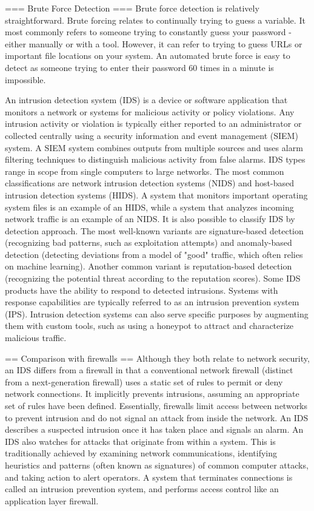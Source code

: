 === Brute Force Detection ===
Brute force detection is relatively straightforward. Brute forcing relates to continually trying to guess a variable. It most commonly refers to someone trying to constantly guess your password - either manually or with a tool. However, it can refer to trying to guess URLs or important file locations on your system.
An automated brute force is easy to detect as someone trying to enter their password 60 times in a minute is impossible.

An intrusion detection system (IDS) is a device or software application that monitors a network or systems for malicious activity or policy violations. Any intrusion activity or violation is typically either reported to an administrator or collected centrally using a security information and event management (SIEM) system. A SIEM system combines outputs from multiple sources and uses alarm filtering techniques to distinguish malicious activity from false alarms.
IDS types range in scope from single computers to large networks. The most common classifications are network intrusion detection systems (NIDS) and host-based intrusion detection systems (HIDS). A system that monitors important operating system files is an example of an HIDS, while a system that analyzes incoming network traffic is an example of an NIDS. It is also possible to classify IDS by detection approach. The most well-known variants are signature-based detection (recognizing bad patterns, such as exploitation attempts) and anomaly-based detection (detecting deviations from a model of "good" traffic, which often relies on machine learning). Another common variant is reputation-based detection (recognizing the potential threat according to the reputation scores). Some IDS products have the ability to respond to detected intrusions. Systems with response capabilities are typically referred to as an intrusion prevention system (IPS). Intrusion detection systems can also serve specific purposes by augmenting them with custom tools, such as using a honeypot to attract and characterize malicious traffic.


== Comparison with firewalls ==
Although they both relate to network security, an IDS differs from a firewall in that a conventional network firewall (distinct from a next-generation firewall) uses a static set of rules to permit or deny network connections. It implicitly prevents intrusions, assuming an appropriate set of rules have been defined. Essentially, firewalls limit access between networks to prevent intrusion and do not signal an attack from inside the network. An IDS describes a suspected intrusion once it has taken place and signals an alarm. An IDS also watches for attacks that originate from within a system. This is traditionally achieved by examining network communications, identifying heuristics and patterns (often known as signatures) of common computer attacks, and taking action to alert operators.  A system that terminates connections is called an intrusion prevention system, and performs access control like an application layer firewall.


